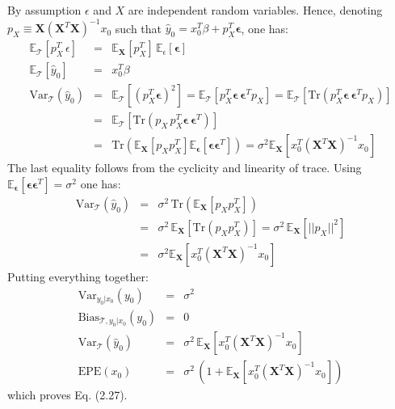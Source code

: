By assumption $\epsilon$ and $X$ are independent random variables. Hence, denoting $p_X \equiv \mathbf{X} \left( \mathbf{X}^T \mathbf{X} \right)^{-1} x_0$ such that $\hat{y}_0 = x_0^T \beta + p_X^T \bm{\epsilon}$, one has:
\begin{eqnarray*}
    \mathbb{E}_{\mathcal{T}} \left[ p_X^T\, \epsilon\right] & = & \mathbb{E}_\mathbf{X}
    \left[p_X^T\right]\, \mathbb{E}_\epsilon \left[\bm{\epsilon}\right] \\
    \mathbb{E}_{\mathcal{T}}\left[\hat{y}_0 \right] & = & x_0 ^T \beta\\
    \textrm{Var}_\mathcal{T}(\hat{y}_0) & = & \mathbb{E}_{\mathcal{T}}\left[ (p_X^T \bm{\epsilon})^2\right] = \mathbb{E} _\mathcal{T}\left[p_X^T \bm{\epsilon} \, \bm{\epsilon}^T p_X \right] = \mathbb{E} _\mathcal{T}\left[\textrm{Tr} \left(p_X^T \bm{\epsilon} \, \bm{\epsilon}^T p_X \right)\right]\\
    & = & \mathbb{E} _\mathcal{T}\left[\textrm{Tr} \left(p_X\, p_X^T \bm{\epsilon} \, \bm{\epsilon}^T \right)\right] \\
    & = & \textrm{Tr} \left(	
    \mathbb{E}_\mathbf{X} \left[ p_X p_X^T \right] \mathbb{E}_{\bm{\epsilon}} \left[\bm{\epsilon} \bm{\epsilon}^T \right]\right) = \sigma ^2 \mathbb{E}_\mathbf{X} \left[x_0^T (\mathbf{X}^T \mathbf{X})^{-1} x_0 \right]
\end{eqnarray*}
The last equality follows from the cyclicity and linearity of trace. Using 
$\mathbb{E}_{\bm{\epsilon}} \left[\bm{\epsilon} \bm{\epsilon}^T \right] = \sigma^2$ one
has:
\begin{eqnarray*}
    \textrm{Var}_\mathcal{T}(\hat{y}_0) & = & \sigma^2 \,\textrm{Tr} \left(	
    \mathbb{E}_\mathbf{X} \left[ p_X p_X^T \right] \right) \\
    & = & \sigma^2 \, \mathbb{E}_\mathbf{X} \left[ \textrm{Tr}\left(p_X p_X^T \right)\right] 
    = \sigma^2 \, \mathbb{E}_\mathbf{X} \left[ ||p_X||^2 \right]\\
    & = & \sigma ^2 \mathbb{E}_\mathbf{X} \left[x_0^T (\mathbf{X}^T \mathbf{X})^{-1} x_0 
    \right]
\end{eqnarray*}
Putting everything together:
\begin{eqnarray*}
    \textrm{Var}_{y_0 | x_0} (y_0) & = & \sigma^2\\
    \textrm{Bias}_{\mathcal{T}, y_0 | x_0}(y_0) & = & 0\\
    \textrm{Var}_\mathcal{T}(\hat{y}_0) & = & \sigma ^2\, \mathbb{E}_\mathbf{X} \left[x_0^T 
    (\mathbf{X}^T \mathbf{X})^{-1} x_0 \right]\\
    \textrm{EPE}(x_0) & = & \sigma^2\, \left( 1 + \mathbb{E}_\mathbf{X} \left[x_0^T 
    (\mathbf{X}^T \mathbf{X})^{-1} x_0 \right] \right)
\end{eqnarray*} 
which proves Eq. (2.27).

